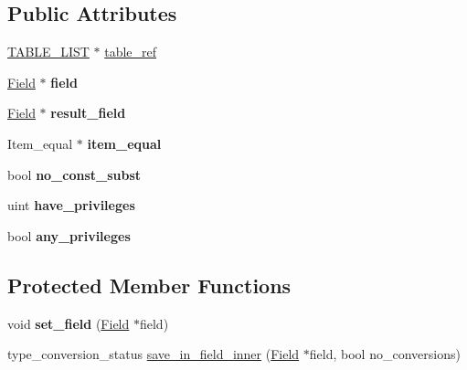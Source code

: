 \subsection*{Public Attributes}
\begin{DoxyCompactItemize}
\item 
\mbox{\hyperlink{structTABLE__LIST}{T\+A\+B\+L\+E\+\_\+\+L\+I\+ST}} $\ast$ \mbox{\hyperlink{classItem__field_a4bfe0257eb0875e8bb671a60997d55b3}{table\+\_\+ref}}
\item 
\mbox{\label{classItem__field_a8c412ec9e38cc572a9c5ac8f1588c1af}} 
\mbox{\hyperlink{classField}{Field}} $\ast$ {\bfseries field}
\item 
\mbox{\label{classItem__field_a5bf402e1a8a5eb4a65c0910f53ac5530}} 
\mbox{\hyperlink{classField}{Field}} $\ast$ {\bfseries result\+\_\+field}
\item 
\mbox{\label{classItem__field_a8a3c7e8da237753c46c320ce67e50f83}} 
Item\+\_\+equal $\ast$ {\bfseries item\+\_\+equal}
\item 
\mbox{\label{classItem__field_a95ab95e84a1ccd8481c1e290cdcc5464}} 
bool {\bfseries no\+\_\+const\+\_\+subst}
\item 
\mbox{\label{classItem__field_a98af5e17df4907c43c834fe2330a8c89}} 
uint {\bfseries have\+\_\+privileges}
\item 
\mbox{\label{classItem__field_a18ce1c745f48f73d401a9d31ae197fa3}} 
bool {\bfseries any\+\_\+privileges}
\end{DoxyCompactItemize}
\subsection*{Protected Member Functions}
\begin{DoxyCompactItemize}
\item 
\mbox{\label{classItem__field_a36a69362f501cb976a5389a223ea6173}} 
void {\bfseries set\+\_\+field} (\mbox{\hyperlink{classField}{Field}} $\ast$field)
\item 
type\+\_\+conversion\+\_\+status \mbox{\hyperlink{classItem__field_a6a89af67b3665a4d25c24300fa8e298e}{save\+\_\+in\+\_\+field\+\_\+inner}} (\mbox{\hyperlink{classField}{Field}} $\ast$field, bool no\+\_\+conversions)
\end{DoxyCompactItemize}
